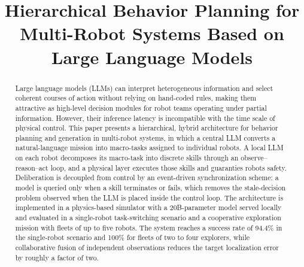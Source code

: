 \documentclass[conference]{IEEEtran}
\begin{document}
\title{Hierarchical Behavior Planning for Multi-Robot Systems Based on Large Language Models}

\author{
\and
{}
\and
{}
}

\maketitle

\begin{abstract}
Large language models (LLMs) can interpret heterogeneous information and
select coherent courses of action without relying on hand-coded rules,
 making them attractive as high-level decision modules for robot
teams operating under partial information. However, their inference
latency is incompatible with the time scale of physical control. This
paper presents a hierarchical, hybrid architecture for behavior planning
and generation in multi-robot systems, in which a central LLM converts a
natural-language mission into macro-tasks assigned to individual robots.
A local LLM on each robot decomposes its macro-task into discrete skills
through an observe--reason--act loop, and a physical layer executes those
skills and guaranties robots safety. Deliberation is decoupled from
control by an event-driven synchronization scheme: a model is queried
only when a skill terminates or fails, which removes the stale-decision
problem observed when the LLM is placed inside the control loop. The
architecture is implemented in a physics-based simulator with a 
20B-parameter model served locally and evaluated in a single-robot task-switching
scenario and a cooperative exploration mission with fleets of up to five
robots. The system reaches a success rate of 94.4\% in the single-robot
scenario and 100\% for fleets of two to four explorers, while
collaborative fusion of independent observations reduces the target
localization error by roughly a factor of two.
\end{abstract}
\end{document}
